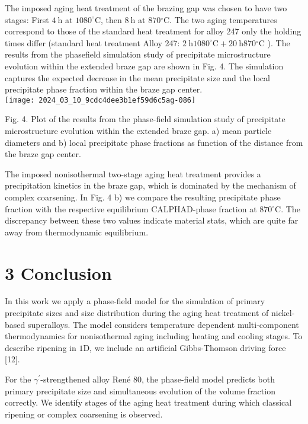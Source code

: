 \documentclass[10pt]{article}
\begin{document}
The imposed aging heat treatment of the brazing gap was chosen to have two stages: First $4 \mathrm{~h}$ at $1080^{\circ} \mathrm{C}$, then $8 \mathrm{~h}$ at $870{ }^{\circ} \mathrm{C}$. The two aging temperatures correspond to those of the standard heat treatment for alloy 247 only the holding times differ (standard heat treatment Alloy 247: $2 \mathrm{~h} 1080^{\circ} \mathrm{C}+20 \mathrm{~h} 870{ }^{\circ} \mathrm{C}$ ). The results from the phasefield simulation study of precipitate microstructure evolution within the extended braze gap are shown in Fig. 4. The simulation captures the expected decrease in the mean precipitate size and the local precipitate phase fraction within the braze gap center.\\
\texttt{[image: 2024\_03\_10\_9cdc4dee3b1ef59d6c5ag-086]}

Fig. 4. Plot of the results from the phase-field simulation study of precipitate microstructure evolution within the extended braze gap. a) mean particle diameters and b) local precipitate phase fractions as function of the distance from the braze gap center.

The imposed nonisothermal two-stage aging heat treatment provides a precipitation kinetics in the braze gap, which is dominated by the mechanism of complex coarsening. In Fig. 4 b) we compare the resulting precipitate phase fraction with the respective equilibrium CALPHAD-phase fraction at $870{ }^{\circ} \mathrm{C}$. The discrepancy between these two values indicate material stats, which are quite far away from thermodynamic equilibrium.

\section*{3 Conclusion}
In this work we apply a phase-field model for the simulation of primary precipitate sizes and size distribution during the aging heat treatment of nickel-based superalloys. The model considers temperature dependent multi-component thermodynamics for nonisothermal aging including heating and cooling stages. To describe ripening in $1 \mathrm{D}$, we include an artificial Gibbs-Thomson driving force [12].

For the $\gamma^{\prime}$-strengthened alloy René 80, the phase-field model predicts both primary precipitate size and simultaneous evolution of the volume fraction correctly. We identify stages of the aging heat treatment during which classical ripening or complex coarsening is observed.
\end{document}

